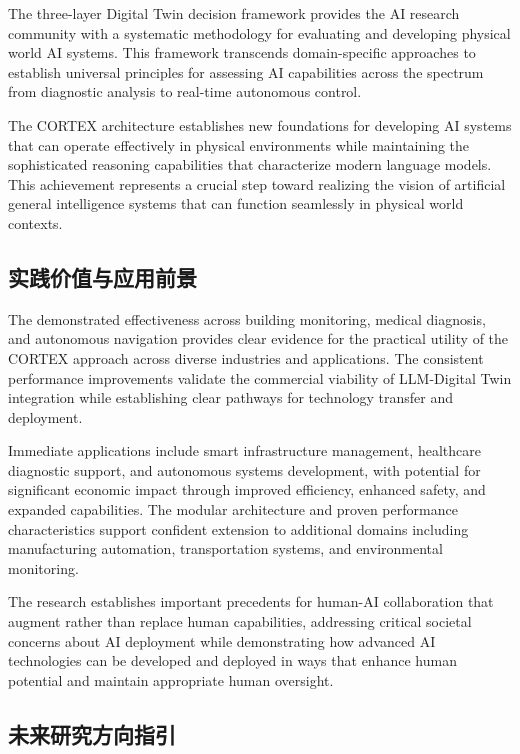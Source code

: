 The three-layer Digital Twin decision framework provides the AI research community with a systematic methodology for evaluating and developing physical world AI systems. This framework transcends domain-specific approaches to establish universal principles for assessing AI capabilities across the spectrum from diagnostic analysis to real-time autonomous control.

The CORTEX architecture establishes new foundations for developing AI systems that can operate effectively in physical environments while maintaining the sophisticated reasoning capabilities that characterize modern language models. This achievement represents a crucial step toward realizing the vision of artificial general intelligence systems that can function seamlessly in physical world contexts.

\subsection{实践价值与应用前景}

The demonstrated effectiveness across building monitoring, medical diagnosis, and autonomous navigation provides clear evidence for the practical utility of the CORTEX approach across diverse industries and applications. The consistent performance improvements validate the commercial viability of LLM-Digital Twin integration while establishing clear pathways for technology transfer and deployment.

Immediate applications include smart infrastructure management, healthcare diagnostic support, and autonomous systems development, with potential for significant economic impact through improved efficiency, enhanced safety, and expanded capabilities. The modular architecture and proven performance characteristics support confident extension to additional domains including manufacturing automation, transportation systems, and environmental monitoring.

The research establishes important precedents for human-AI collaboration that augment rather than replace human capabilities, addressing critical societal concerns about AI deployment while demonstrating how advanced AI technologies can be developed and deployed in ways that enhance human potential and maintain appropriate human oversight.

\subsection{未来研究方向指引}

